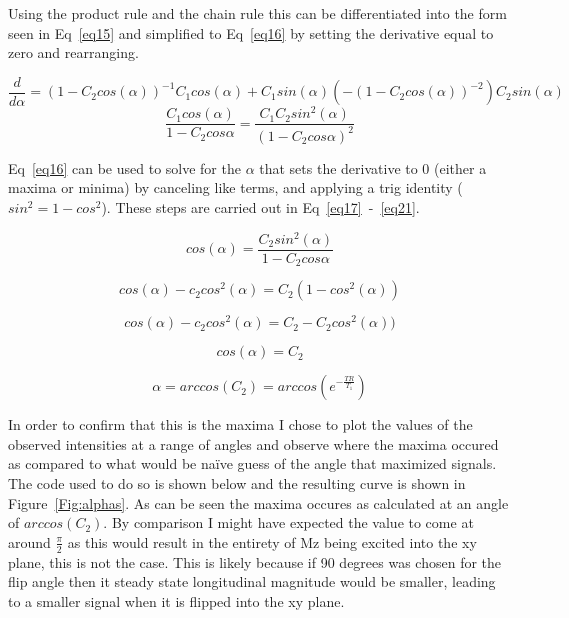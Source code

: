 \documentclass[12pt]{article}
\begin{document}
Using the product rule and the chain rule this can be differentiated into the form seen in Eq~\ref{eq15} and simplified to Eq~\ref{eq16} by setting the derivative equal to zero and rearranging.

\begin{equation}
\frac{d}{d\alpha} = (1- C_2cos(\alpha))^{-1} C_1cos(\alpha) + C_1sin(\alpha)(-(1- C_2cos(\alpha))^{-2})C_2sin(\alpha)
\label{eq15}
\end{equation}
\begin{equation}
\frac{C_1cos(\alpha)}{1-C_2cos{\alpha}} = \frac{C_1C_2sin^2(\alpha)}{(1-C_2cos{\alpha})^2}
\label{eq16}
\end{equation}

Eq~\ref{eq16} can be used to solve for the $\alpha$ that sets the derivative to 0 (either a maxima or minima) by canceling like terms, and applying a trig identity ($sin^2 = 1-cos^2$). These steps are carried out in Eq~\ref{eq17}~-~\ref{eq21}.

\begin{equation}
cos(\alpha) = \frac{C_2sin^2(\alpha)}{1-C_2cos{\alpha}}
\label{eq17}
\end{equation}

\begin{equation}
cos(\alpha) - c_2cos^2(\alpha) = C_2(1-cos^2(\alpha))
\label{eq18}
\end{equation}

\begin{equation}
cos(\alpha) - c_2cos^2(\alpha) = C_2-C_2cos^2(\alpha))
\label{eq19}
\end{equation}

\begin{equation}
cos(\alpha) = C_2
\label{eq20}
\end{equation}

\begin{equation}
\alpha = arccos(C_2) = arccos(e^{-\frac{TR}{T_1}})
\label{eq21}
\end{equation}

In order to confirm that this is the maxima I chose to plot the values of the observed intensities at a range of angles and observe where the maxima occured as compared to what would be na\"ive guess of the angle that maximized signals. The code used to do so is shown below and the resulting curve is shown in Figure~\ref{Fig:alphas}. As can be seen the maxima occures as calculated at an angle of $arccos(C_2)$. By comparison I might have expected the value to come at around $\frac{\pi}{2}$ as this would result in the entirety of Mz being excited into the xy plane, this is not the case. This is likely because if 90 degrees was chosen for the flip angle then it steady state longitudinal magnitude would be smaller, leading to a smaller signal when it is flipped into the xy plane.
\end{document}
